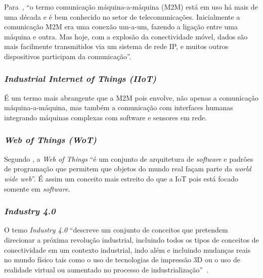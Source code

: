 \documentclass[pdftex, brazil, 12pt, twoside]{article}
\newcommand{\ingles}[1]{\textit{#1}}
\begin{document}
Para~\citet{LuethIoT2014}, ``o termo comunicação máquina-a-máquina (M2M) está em
uso há mais de uma década e é bem conhecido no setor de telecomunicações. Inicialmente
a comunicação M2M era uma conexão um-a-um, fazendo a ligação entre uma máquina e outra.
Mas hoje, com a explosão da conectividade móvel, dados são mais facilmente transmitidos
via um sistema de rede IP, e muitos outros dispositivos participam da comunicação''.


\subsubsection{\ingles{Industrial Internet of Things (IIoT)}}
\label{o-que-e-iot-outros-tipos-iiot}

É um termo mais abrangente que a M2M pois envolve, não apenas a comunicação
máquina-a-máquina, mas também a comunicação com interfaces humanas \citet{LuethIoT2014}
integrando máquinas complexas com software e sensores em rede.


\subsubsection{\ingles{Web of Things (WoT)}}
\label{o-que-e-iot-outros-tipos-wot}

Segundo \citet{LuethIoT2014}, a \ingles{Web of Things} ``é um conjunto de
arquitetura de \ingles{software} e padrões de programação que permitem que
objetos do mundo real façam parte da \ingles{world wide web}''. É assim um conceito
mais estreito do que a IoT pois está focado somente em \ingles{software}.


\subsubsection{\ingles{Industry 4.0}}
\label{o-que-e-iot-outros-tipos-industry-4.0}

O temo \ingles{Industry 4.0} ``descreve um conjunto de conceitos que pretendem
direcionar a próxima revolução industrial, incluindo todos os tipos de conceitos
de conectividade em um contexto industrial, indo além e incluindo mudanças reais
no mundo físico tais como o uso de tecnologias de impressão 3D ou o uso de realidade
virtual ou aumentado no processo de industrialização''~\citet{LuethIoT2014}.
\end{document}

